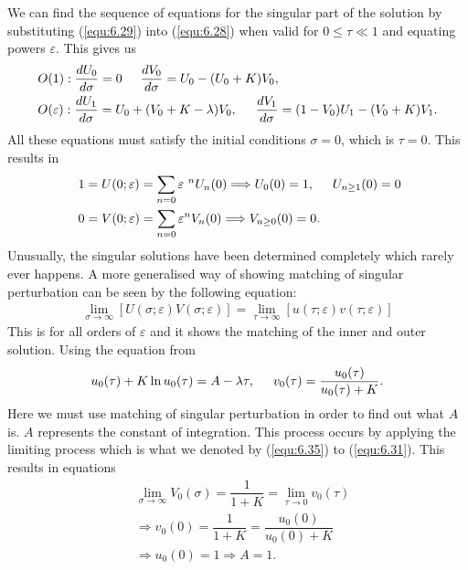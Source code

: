 \documentclass[a4paper]{report}
\theoremstyle{definition}
\begin{document}
We can find the sequence of equations for the singular part of the solution by substituting (\ref{equ:6.29}) into (\ref{equ:6.28}) when valid for $0\leq\tau\ll1$ and equating powers $\varepsilon$. This gives us 
\begin{align}\label{equ:6.33}
&O(1): \dfrac{dU_0}{d\sigma}=0\hspace{5mm} \dfrac{dV_0}{d\sigma}=U_0-(U_0+K)V_0,\\
&O(\varepsilon): \dfrac{dU_1}{d\sigma}=U_0+(V_0+K-\lambda)V_0,\hspace{5mm}\dfrac{dV_1}{d\sigma}=(1-V_0)U_1-(V_0+K)V_1.
\end{align}
All these equations must satisfy the initial conditions $\sigma=0$, which is $\tau=0$. This results in 
\begin{align}\label{equ:6.34}
\ &1=U(0;\varepsilon)= \sum_{n=0}\varepsilon\
{^n}U_n(0)\Longrightarrow U_0(0)=1,\hspace{5mm}U_{n\geq1}(0)=0\\
\ &0=V(0;\varepsilon)= \sum_{n=0}\varepsilon{^n}V_n(0)\Longrightarrow V_{n\geq0}(0)=0.
\end{align}
Unusually, the singular solutions have been determined completely which rarely ever happens. A more generalised way of showing matching of singular perturbation can be seen by the following equation:
\begin{align}\label{equ:6.35}
\lim_{\sigma \to \infty}[U(\sigma;\varepsilon)V(\sigma;\varepsilon)]=\lim_{\tau \to \infty}[u(\tau;\varepsilon)v(\tau;\varepsilon)]
\end{align}
This is for all orders of $\varepsilon$ and it shows the matching of the inner and outer solution. Using the equation from
\begin{align}
u_0(\tau)+K\ln u_0(\tau)=A-\lambda\tau,\hspace{5mm} v_0(\tau)=\dfrac{u_0(\tau)}{u_0(\tau)+K}.
\end{align}
Here we must use matching of singular perturbation in order to find out what $A$ is. $A$ represents the constant of integration. This process occurs by  applying the limiting process which is what we denoted by (\ref{equ:6.35}) to (\ref{equ:6.31}). This results in equations
\begin{align}
&\lim_{\sigma \to \infty}V_0(\sigma)=\dfrac{1}{1+K}=\lim_{\tau \to 0}v_0(\tau)\\
&\Rightarrow v_0(0)=\dfrac{1}{1+K}=\dfrac{u_0(0)}{u_0(0)+K}\\
&\Rightarrow u_0(0)=1\Rightarrow A=1.
\end{align}
\end{document}

